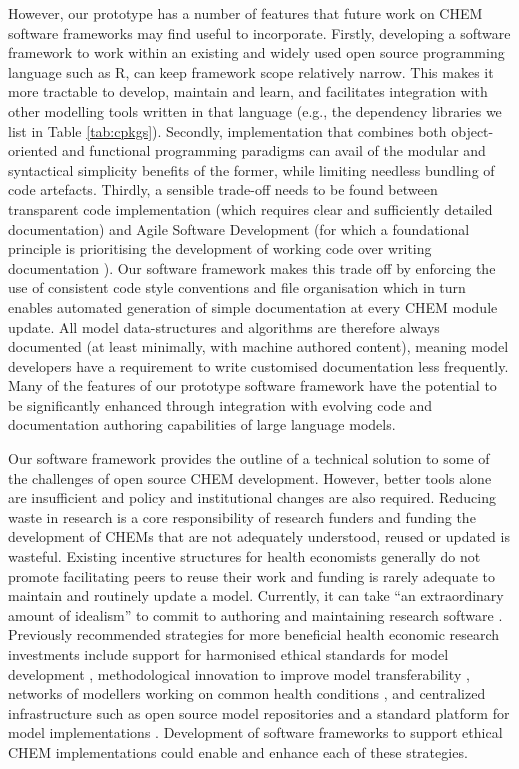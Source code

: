 \documentclass[sn-vancouver,Numbered,pdflatex]{sn-jnl}
\theoremstyle{remark}
\theoremstyle{definition}
\begin{document}
However, our prototype has a number of features that future work on CHEM software frameworks may find useful to incorporate. Firstly, developing a software framework to work within an existing and widely used open source programming language such as R, can keep framework scope relatively narrow. This makes it more tractable to develop, maintain and learn, and facilitates integration with other modelling tools written in that language (e.g., the dependency libraries we list in Table \ref{tab:cpkgs}). Secondly, implementation that combines both object-oriented and functional programming paradigms can avail of the modular and syntactical simplicity benefits of the former, while limiting needless bundling of code artefacts. Thirdly, a sensible trade-off needs to be found between transparent code implementation (which requires clear and sufficiently detailed documentation) and Agile Software Development (for which a foundational principle is prioritising the development of working code over writing documentation \citep{beck2001manifesto}). Our software framework makes this trade off by enforcing the use of consistent code style conventions and file organisation which in turn enables automated generation of simple documentation at every CHEM module update. All model data-structures and algorithms are therefore always documented (at least minimally, with machine authored content), meaning model developers have a requirement to write customised documentation less frequently. Many of the features of our prototype software framework have the potential to be significantly enhanced through integration with evolving code and documentation authoring capabilities of large language models.

Our software framework provides the outline of a technical solution to some of the challenges of open source CHEM development. However, better tools alone are insufficient and policy and institutional changes are also required. Reducing waste in research is a core responsibility of research funders \citep{chalmers2014increase} and funding the development of CHEMs that are not adequately understood, reused or updated is wasteful. Existing incentive structures for health economists generally do not promote facilitating peers to reuse their work and funding is rarely adequate to maintain and routinely update a model. Currently, it can take ``an extraordinary amount of idealism'' to commit to authoring and maintaining research software \citep{anzt2020environment}. Previously recommended strategies for more beneficial health economic research investments include support for harmonised ethical standards for model development \citep{10.3389/fpubh.2017.00068}, methodological innovation to improve model transferability \citep{craig2018taking}, networks of modellers working on common health conditions \citep{Sampson2019}, and centralized infrastructure such as open source model repositories \citep{Pouwels2022} and a standard platform for model implementations \citep{Ghabri2019}. Development of software frameworks to support ethical CHEM implementations could enable and enhance each of these strategies.
\end{document}
